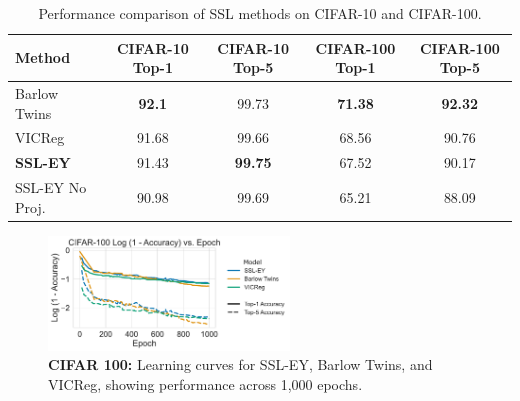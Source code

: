 \begin{table}[H]
    \centering
    \begin{tabular}{lcccc}
        \hline
        Method          & CIFAR-10 Top-1 & CIFAR-10 Top-5 & CIFAR-100 Top-1 & CIFAR-100 Top-5 \\
        \hline
        Barlow Twins    & \textbf{92.1}  & 99.73          & \textbf{71.38}  & \textbf{92.32}  \\
        VICReg          & 91.68          & 99.66          & 68.56           & 90.76           \\
        \textbf{SSL-EY} & 91.43          & \textbf{99.75} & 67.52           & 90.17           \\
        \hline
        SSL-EY No Proj. & 90.98          & 99.69          & 65.21           & 88.09           \\
        \hline
    \end{tabular}
    \caption{Performance comparison of SSL methods on CIFAR-10 and CIFAR-100.}
    \label{tab:selfsup}
\end{table}

\begin{figure}[H]
    \centering
    \includegraphics[width=0.57\textwidth]{figures/SSL/cifar100_learning_curve_log_error}
    \caption{\textbf{CIFAR 100: } Learning curves for SSL-EY, Barlow Twins, and VICReg, showing performance across 1,000 epochs.}
    \label{fig:ssl learning curve cifar100 top5}
\end{figure}

